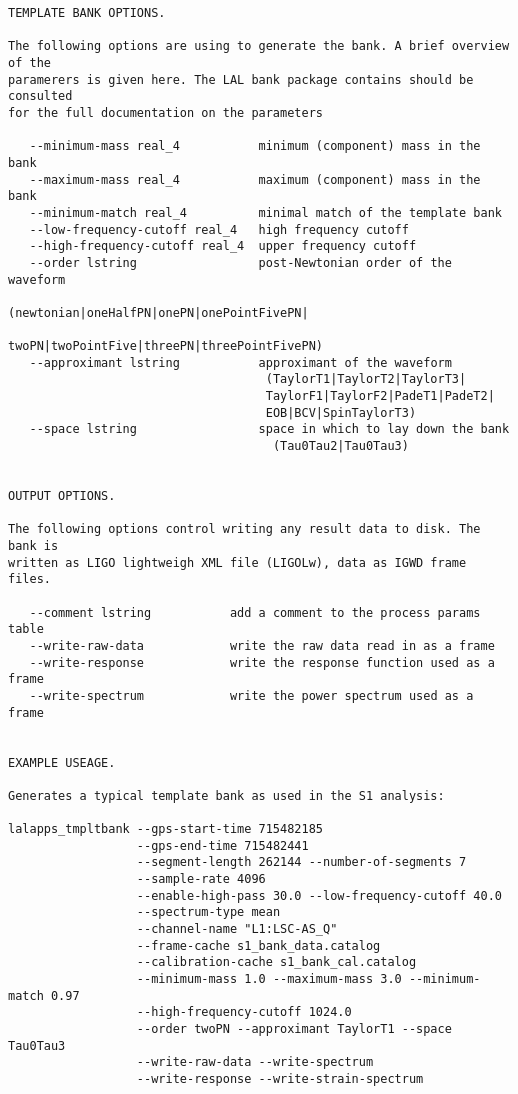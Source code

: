 \begin{verbatim}
TEMPLATE BANK OPTIONS.

The following options are using to generate the bank. A brief overview of the
paramerers is given here. The LAL bank package contains should be consulted
for the full documentation on the parameters

   --minimum-mass real_4           minimum (component) mass in the bank
   --maximum-mass real_4           maximum (component) mass in the bank
   --minimum-match real_4          minimal match of the template bank
   --low-frequency-cutoff real_4   high frequency cutoff
   --high-frequency-cutoff real_4  upper frequency cutoff
   --order lstring                 post-Newtonian order of the waveform
                                    (newtonian|oneHalfPN|onePN|onePointFivePN|
                                    twoPN|twoPointFive|threePN|threePointFivePN)
   --approximant lstring           approximant of the waveform
                                    (TaylorT1|TaylorT2|TaylorT3|
                                    TaylorF1|TaylorF2|PadeT1|PadeT2|
                                    EOB|BCV|SpinTaylorT3)
   --space lstring                 space in which to lay down the bank
                                     (Tau0Tau2|Tau0Tau3)


OUTPUT OPTIONS.

The following options control writing any result data to disk. The bank is
written as LIGO lightweigh XML file (LIGOLw), data as IGWD frame files.

   --comment lstring           add a comment to the process params table
   --write-raw-data            write the raw data read in as a frame
   --write-response            write the response function used as a frame
   --write-spectrum            write the power spectrum used as a frame


EXAMPLE USEAGE.

Generates a typical template bank as used in the S1 analysis:

lalapps_tmpltbank --gps-start-time 715482185 
                  --gps-end-time 715482441 
                  --segment-length 262144 --number-of-segments 7 
                  --sample-rate 4096 
                  --enable-high-pass 30.0 --low-frequency-cutoff 40.0 
                  --spectrum-type mean 
                  --channel-name "L1:LSC-AS_Q" 
                  --frame-cache s1_bank_data.catalog 
                  --calibration-cache s1_bank_cal.catalog 
                  --minimum-mass 1.0 --maximum-mass 3.0 --minimum-match 0.97 
                  --high-frequency-cutoff 1024.0 
                  --order twoPN --approximant TaylorT1 --space Tau0Tau3 
                  --write-raw-data --write-spectrum 
                  --write-response --write-strain-spectrum
\end{verbatim}

